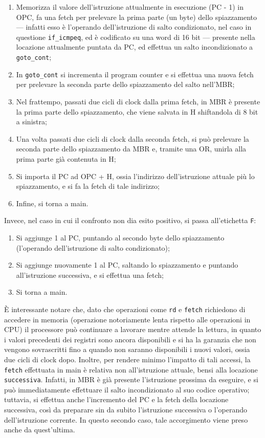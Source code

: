 \begin{enumerate}
    \item Memorizza il valore dell'istruzione attualmente in esecuzione (PC - 1) in OPC, fa una fetch per prelevare la prima parte (un byte) dello spiazzamento --- infatti esso è l'operando dell'istruzione di salto condizionato, nel caso in questione \texttt{if\_icmpeq}, ed è codificato su una word di 16 bit --- presente nella locazione attualmente puntata da PC, ed effettua un salto incondizionato a \texttt{goto\_cont};
    \item In \texttt{goto\_cont} si incrementa il program counter e si effettua una nuova fetch per prelevare la seconda parte dello spiazzamento del salto nell'MBR;
    \item Nel frattempo, passati due cicli di clock dalla prima fetch, in MBR è presente la prima parte dello spiazzamento, che viene salvata in H shiftandola di 8 bit a sinistra;
    \item Una volta passati due cicli di clock dalla seconda fetch, si può prelevare la seconda parte dello spiazzamento da MBR e, tramite una OR, unirla alla prima parte già contenuta in H;
    \item Si importa il PC ad OPC + H, ossia l'indirizzo dell'istruzione attuale più lo spiazzamento, e si fa la fetch di tale indirizzo;
    \item Infine, si torna a main.
\end{enumerate}

Invece, nel caso in cui il confronto non dia esito positivo, si passa all'etichetta \texttt{F}:

\begin{enumerate}
    \item Si aggiunge 1 al PC, puntando al secondo byte dello spiazzamento (l'operando dell'istruzione di salto condizionato);
    \item Si aggiunge nuovamente 1 al PC, saltando lo spiazzamento e puntando all'istruzione successiva, e si effettua una fetch;
    \item Si torna a main.
\end{enumerate}

È interessante notare che, dato che operazioni come \texttt{rd} e \texttt{fetch} richiedono di accedere in memoria (operazione notoriamente lenta rispetto alle operazioni in CPU) il processore può continuare a lavorare mentre attende la lettura, in quanto i valori precedenti dei registri sono ancora disponibili e si ha la garanzia che non vengono sovrascritti fino a quando non saranno disponibili i nuovi valori, ossia due cicli di clock dopo. Inoltre, per rendere minimo l'impatto di tali accessi, la \texttt{fetch} effettuata in main è relativa non all'istruzione attuale, bensi alla locazione \texttt{successiva}. Infatti, in MBR è già presente l'istruzione prossima da eseguire, e si può immediatamente effettuare il salto incondizionato al suo codice operativo; tuttavia, si effettua anche l'incremento del PC e la fetch della locazione successiva, così da preparare sin da subito l'istruzione successiva o l'operando dell'istruzione corrente. In questo secondo caso, tale accorgimento viene preso anche da quest'ultima.

